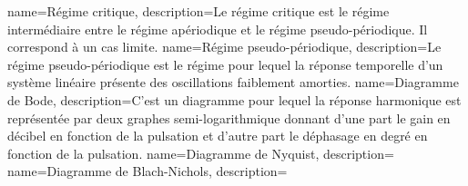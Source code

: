 %
{%
  name={Régime critique},%
  description={Le régime critique est le régime intermédiaire entre le régime
      apériodique et le régime pseudo-périodique. Il correspond à un cas limite.
  }
}
%
{%
  name={Régime pseudo-périodique},%
  description={Le régime pseudo-périodique est le régime pour lequel la réponse
  temporelle d'un système linéaire présente des oscillations faiblement 
  amorties.
  }
}
%
{%
  name={Diagramme de Bode},%
  description={C'est un diagramme pour lequel la réponse harmonique est 
  représentée par deux graphes semi-logarithmique donnant d'une part le gain 
  en décibel en fonction de la pulsation et d'autre part le déphasage en degré
  en fonction de la pulsation.
  }
}
%
{%
  name={Diagramme de Nyquist},%
  description={
  }
}
%
{%
  name={Diagramme de Blach-Nichols},%
  description={
  }
}
